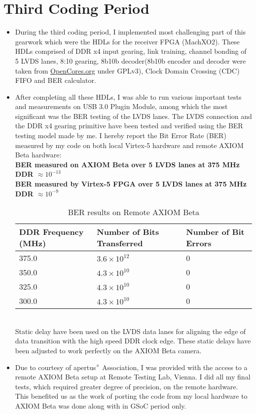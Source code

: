 \documentclass[11pt,oneside,fleqn]{book} %
\begin{document}
\section{Third Coding Period}
\begin{itemize}
\item During the third coding period, I implemented most challenging part of this gearwork which were the HDLs for the receiver FPGA (MachXO2). These HDLs comprised of DDR x4 input gearing, link training, channel bonding of 5 LVDS lanes, 8:10 gearing, 8b10b decoder(8b10b encoder and decoder were taken from \textcolor{blue}{\href{https://opencores.org/projects/8b10b_encdec}{OpenCores.org}} under GPLv3), Clock Domain Crossing (CDC) FIFO and BER calculator.
\item After completing all these HDLs, I was able to run various important tests and measurements on USB 3.0 Plugin Module, among which the most significant was the BER testing of the LVDS lanes. The LVDS connection and the DDR x4 gearing primitive have been tested and verified using the BER testing model made by me. I hereby report the Bit Error Rate (BER) measured by my code on both local Virtex-5 hardware and remote AXIOM Beta hardware: \\
\textbf{BER measured on AXIOM Beta over 5 LVDS lanes at 375 MHz DDR ${\approx10^{-13}}$ \\
BER measured by Virtex-5 FPGA over 5 LVDS lanes at 375 MHz DDR ${\approx10^{-9}}$}
\\
\begin{table}[h!]
\centering
\begin{tabular}{l l l}
\toprule
\textbf{DDR Frequency (MHz)} & \textbf{Number of Bits Transferred} & \textbf{Number of Bit Errors}\\
\midrule
375.0 & $3.6\times10^{12}$ & 0 \\
350.0 & $4.3\times10^{10}$ & 0 \\
325.0 & $4.3\times10^{10}$ & 0 \\
300.0 & $4.3\times10^{10}$ & 0 \\
\bottomrule
\end{tabular}
\caption{BER results on Remote AXIOM Beta}
\end{table}
\\
\qquad
 Static delay have been used on the LVDS data lanes for aligning the edge of data transition with the high speed DDR clock edge. These static delays have been adjusted to work perfectly on the AXIOM Beta camera.
\item Due to courtesy of apertus$\degree$ Association, I was provided with the access to a remote AXIOM Beta setup at Remote Testing Lab, Vienna. I did all my final tests, which required greater degree of precision, on the remote hardware. This benefited us as the work of porting the code from my local hardware to AXIOM Beta was done along with in GSoC period only.  

\end{itemize}
\end{document}
